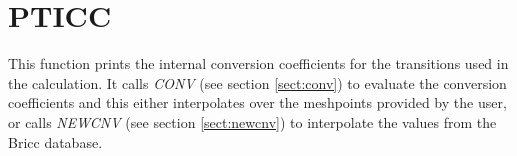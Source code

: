 \section{PTICC}
\label{sect:pticc}

\noindent This function prints the internal conversion coefficients for the
transitions used in the calculation. It calls {\em CONV} (see section
\ref{sect:conv}) to evaluate the conversion coefficients and this either
interpolates over the meshpoints provided by the user, or calls {\em NEWCNV}
(see section \ref{sect:newcnv}) to interpolate the values from the Bricc
database.\\


